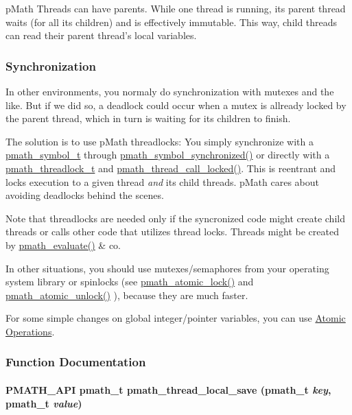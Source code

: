 pMath Threads can have parents. While one thread is running, its parent thread waits (for all its children) and is effectively immutable. This way, child threads can read their parent thread's local variables.\hypertarget{group__threads_section_thread_syncronization}{}\subsubsection{Synchronization}\label{group__threads_section_thread_syncronization}
In other environments, you normaly do synchronization with mutexes and the like. But if we did so, a deadlock could occur when a mutex is allready locked by the parent thread, which in turn is waiting for its children to finish.

The solution is to use pMath threadlocks: You simply synchronize with a \hyperlink{classpmath__symbol__t}{pmath\_\-symbol\_\-t} through \hyperlink{group__symbols_g95b141d9cb33fba80d6a807f304ee3b7}{pmath\_\-symbol\_\-synchronized()} or directly with a \hyperlink{classpmath__threadlock__t}{pmath\_\-threadlock\_\-t} and \hyperlink{group__threads_gfcbd1d376791cb95a78e102366b7b79a}{pmath\_\-thread\_\-call\_\-locked()}. This is reentrant and locks execution to a given thread {\em and\/} its child threads. pMath cares about avoiding deadlocks behind the scenes.

Note that threadlocks are needed only if the syncronized code might create child threads or calls other code that utilizes thread locks. Threads might be created by \hyperlink{classpmath__t_d95c86ef0de178de4d3560518c8a8157}{pmath\_\-evaluate()} \& co.

In other situations, you should use mutexes/semaphores from your operating system library or spinlocks (see \hyperlink{group__atomic__ops_gf143a22332da6a2065bac14069ecbf7f}{pmath\_\-atomic\_\-lock()} and \hyperlink{group__atomic__ops_ga61bbbab4adc550cc66d1d5f9cf22afd}{pmath\_\-atomic\_\-unlock()} ), because they are much faster.

For some simple changes on global integer/pointer variables, you can use \hyperlink{group__atomic__ops}{Atomic Operations}. 

\subsubsection{Function Documentation}
\hypertarget{group__threads_ga545e19cccf64ee4848a5506fa20cf21}{
\paragraph[{pmath\_\-thread\_\-local\_\-save}]{\setlength{\rightskip}{0pt plus 5cm}PMATH\_\-API {\bf pmath\_\-t} pmath\_\-thread\_\-local\_\-save ({\bf pmath\_\-t} {\em key}, \/  {\bf pmath\_\-t} {\em value})}\hfill}
\label{group__threads_ga545e19cccf64ee4848a5506fa20cf21}


